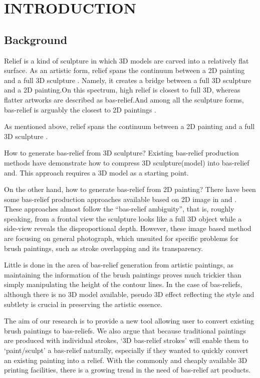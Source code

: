 \chapter{INTRODUCTION}

\section{Background}

Relief is a kind of sculpture in which 3D models are carved into a relatively flat surface. As an artistic form, relief spans the continuum between a 2D painting and a full 3D sculpture \cite{weyrich2007digital}. Namely, it creates a bridge between a full 3D sculpture and a 2D painting\cite{kerber2009feature}.On this spectrum, high relief is closest to full 3D, whereas flatter artworks are described as bas-relief.And  among all the sculpture forms, bas-relief is arguably the closest to 2D paintings \cite{kerber2009feature}.


As mentioned above, relief spans the continuum between a 2D painting and a full 3D sculpture \cite{weyrich2007digital}.

How to generate bas-relief from 3D sculpture?  Existing bas-relief production methods have demonstrate how to compress 3D sculpture(model) into bas-relief \cite{weyrich2007digital}and\cite{kerber2009feature}. This approach requires a 3D model as a starting point. 

On the other hand, how to generate bas-relief from 2D painting?
There have been some bas-relief production approaches available based on 2D image in\cite{zeng2014region}\cite{wu2013making} and \cite{alexa2010reliefs}. These approaches almost follow the “bas-relief ambiguity”\cite{belhumeur1999bas}, that is, roughly speaking, from a frontal view the sculpture looks like a full 3D object while a side-view reveals the disproportional depth. 
However, these image based method are focusing on general photograph, which unsuited for specific problems for brush paintings, such as stroke overlapping and its transparency.  

Little is done in the area of bas-relief generation from artistic paintings, as maintaining the information of the brush paintings proves much trickier than simply manipulating the height of the contour lines. In the case of bas-reliefs, although there is no 3D model available, pseudo 3D effect reflecting the style and subtlety is crucial in preserving the artistic essence.

The aim of our research is to provide a new tool allowing user to convert existing brush paintings to bas-reliefs. We also argue that because traditional paintings are produced with individual strokes, ‘3D bas-relief strokes’ will enable them to ‘paint/sculpt’ a bas-relief naturally, especially if they wanted to quickly convert an existing painting into a relief. With the commonly and cheaply available 3D printing facilities, there is a growing trend in the need of bas-relief art products.

